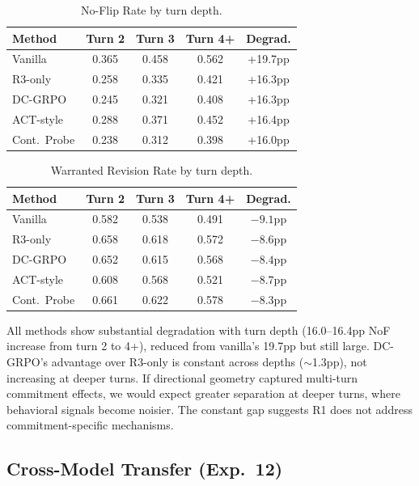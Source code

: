 \documentclass[11pt,a4paper]{article}
\begin{document}
\begin{table}[h]
\centering
\small
\caption{No-Flip Rate by turn depth.}
\label{tab:nof_depth}
\begin{tabular}{lcccc}
\toprule
Method & Turn 2 & Turn 3 & Turn 4+ & Degrad. \\
\midrule
Vanilla       & 0.365 & 0.458 & 0.562 & +19.7pp \\
R3-only       & 0.258 & 0.335 & 0.421 & +16.3pp \\
DC-GRPO       & 0.245 & 0.321 & 0.408 & +16.3pp \\
ACT-style     & 0.288 & 0.371 & 0.452 & +16.4pp \\
Cont.\ Probe  & 0.238 & 0.312 & 0.398 & +16.0pp \\
\bottomrule
\end{tabular}
\end{table}

\begin{table}[h]
\centering
\small
\caption{Warranted Revision Rate by turn depth.}
\label{tab:wrr_depth}
\begin{tabular}{lcccc}
\toprule
Method & Turn 2 & Turn 3 & Turn 4+ & Degrad. \\
\midrule
Vanilla       & 0.582 & 0.538 & 0.491 & $-9.1$pp \\
R3-only       & 0.658 & 0.618 & 0.572 & $-8.6$pp \\
DC-GRPO       & 0.652 & 0.615 & 0.568 & $-8.4$pp \\
ACT-style     & 0.608 & 0.568 & 0.521 & $-8.7$pp \\
Cont.\ Probe  & 0.661 & 0.622 & 0.578 & $-8.3$pp \\
\bottomrule
\end{tabular}
\end{table}

All methods show substantial degradation with turn depth (16.0--16.4pp NoF increase from turn 2 to 4+), reduced from vanilla's 19.7pp but still large. DC-GRPO's advantage over R3-only is constant across depths ($\sim$1.3pp), not increasing at deeper turns. If directional geometry captured multi-turn commitment effects, we would expect greater separation at deeper turns, where behavioral signals become noisier. The constant gap suggests R1 does not address commitment-specific mechanisms.

\subsection{Cross-Model Transfer (Exp.\ 12)}
\label{sec:cross_model}
\end{document}
